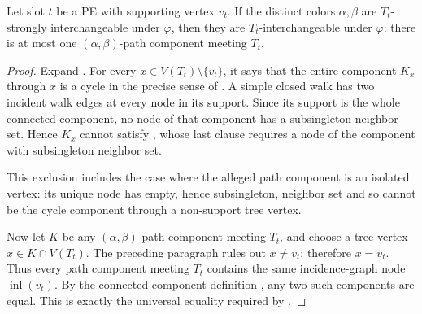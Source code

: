 \begin{lemma}
Let slot \(t\) be a PE with supporting vertex \(v_t\).  If the distinct
colors \(\alpha,\beta\) are \(T_t\)-strongly interchangeable under
\(\varphi\), then they are \(T_t\)-interchangeable under \(\varphi\):
there is at most one \((\alpha,\beta)\)-path component meeting \(T_t\).
\end{lemma}
\begin{proof}
Expand .  For every
\(x\in V(T_t)\setminus\{v_t\}\), it says that the entire component
\(K_x\) through \(x\) is a cycle in the precise sense of
.  A simple closed walk has two incident
walk edges at every node in its support.  Since its support is the whole
connected component, no node of that component has a subsingleton
neighbor set.  Hence \(K_x\) cannot satisfy
, whose last clause requires a node of the
component with subsingleton neighbor set.

This exclusion includes the case where the alleged path component is an
isolated vertex: its unique node has empty, hence subsingleton, neighbor
set and so cannot be the cycle component through a non-support tree
vertex.

Now let \(K\) be any \((\alpha,\beta)\)-path component meeting \(T_t\),
and choose a tree vertex \(x\in K\cap V(T_t)\).  The preceding paragraph
rules out \(x\ne v_t\); therefore \(x=v_t\).  Thus every path component
meeting \(T_t\) contains the same incidence-graph node
\(\operatorname{inl}(v_t)\).  By the connected-component definition
, any two such components are equal.
This is exactly the universal equality required by
.
\end{proof}
